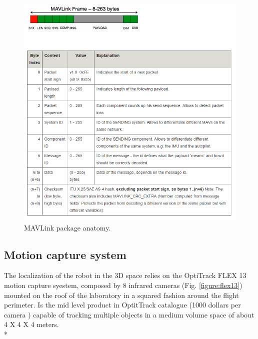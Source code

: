 \begin{figure}[H]
 \centering
 \includegraphics[width=1\textwidth]{MAVPack.PNG}
 \caption[MAVLink package anatomy]{MAVLink package anatomy.}
 \label{figure:MAV_anatomy}
\end{figure}

\newpage
\subsection{Motion capture system}
\label{sec:mocap}
The localization of the robot in the 3D space relies on the OptiTrack FLEX 13 motion capture syestem, composed by 8 infrared cameras (Fig. \ref{figure:flex13}) mounted on the roof of the laboratory in a squared fashion around the flight perimeter. Is the mid level product in OptitTrack catalogue (1000 dollars per camera \cite{OptiT}) capable of tracking multiple objects in a medium volume space of about 4 X 4 X 4 meters.\\*

